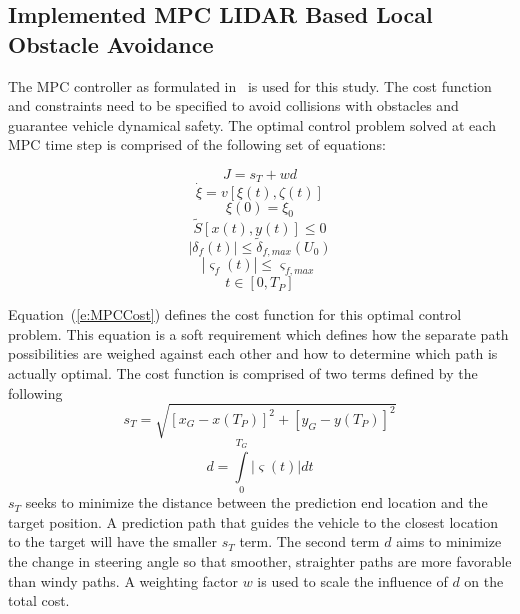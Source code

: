\documentclass[12pt,twocolumn]{article}
\begin{document}
\subsection{Implemented MPC LIDAR Based Local Obstacle Avoidance}\label{ss:MPCImplementation}

The MPC controller as formulated in~\cite{ModelFidelity2016} is used for this study. The cost function and constraints need to be specified to avoid collisions with obstacles and guarantee vehicle dynamical safety. The optimal control problem solved at each MPC time step is comprised of the following set of equations:

\begin{equation}\label{e:MPCCost}
J = s_T + wd 
\end{equation}
\begin{equation}\label{e:State_ODE}
\dot{\xi} = v\left[\xi\left(t\right),\zeta\left(t\right)\right] 
\end{equation}
\begin{equation}\label{e:InitialStates}
\xi\left(0\right) = \xi_0 
\end{equation}
\begin{equation}\label{e:SafeArea}
\tilde{S}\left[x\left(t\right),y\left(t\right)\right] \leq0  
\end{equation}
\begin{equation}\label{e:SteerLimit}
\left|\delta_f\left(t\right)\right| \leq\tilde{\delta}_{f,max}\left(U_0\right) 
\end{equation}
\begin{equation}\label{e:SteerRateLimit}
\left|\varsigma_f\left(t\right)\right| \leq\varsigma_{f,max} 
\end{equation}
\begin{equation}\label{e:TimeDomain}
t \in \left[0,T_P\right]
\end{equation}

Equation~(\ref{e:MPCCost}) defines the cost function for this optimal control problem. This equation is a soft requirement which defines how the separate path possibilities are weighed against each other and how to determine which path is actually optimal. The cost function is comprised of two terms defined by the following
%
\begin{equation}\label{e:DistanceCost}
s_T = \sqrt{\left[ x_G - x\left(T_P\right)\right]^2 + \left[y_G - y\left(T_P\right)\right]^2 }
\end{equation}
\begin{equation}\label{e:TurningCost}
d = \int \limits_0^{T_G} \left|\varsigma\left(t\right)\right| dt 
\end{equation}
%
$s_{T}$ seeks to minimize the distance between the prediction end location and the target position. A prediction path that guides the vehicle to the closest location to the target will have the smaller $s_{T}$ term. The second term $d$ aims to minimize the change in steering angle so that smoother, straighter paths are more favorable than windy paths. A weighting factor $w$ is used to scale the influence of $d$ on the total cost.
\end{document}
